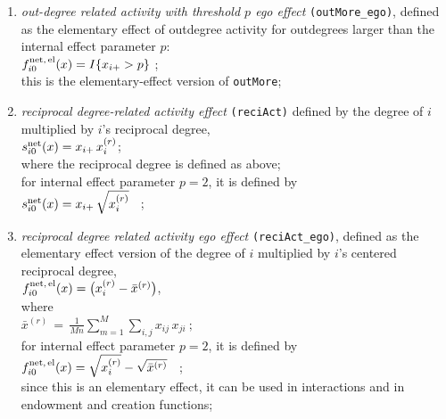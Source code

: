 \documentclass[a4paper,fleqn,11pt]{article}
\newcommand{\+}{\, + \,}
\newcommand{\vit}{\theenumi}
\begin{document}
\begin{enumerate}
 \item {\em out-degree related activity with threshold $p$ ego effect} \texttt{(outMore\_ego)},
 	 defined as the elementary effect of outdegree activity
 for  outdegrees larger than the internal effect parameter $p$:\\
 $ f^{\rm net,\, el}_{i\vit}(x)  =  I \{  x_{i+} > p \} $ ;\\
 this is the elementary-effect version of \texttt{outMore};

 \item {\em reciprocal degree-related activity effect} \texttt{(reciAct)}
 defined by the degree of $i$ multiplied by $i$'s reciprocal degree,\\
 $s^{\rm net}_{i\vit}(x) =   x_{i+}\, x^{(r)}_{i} $; \\
 where the reciprocal degree is defined as above;\\
 for internal effect parameter $p=2$, it is defined by\\
 $s^{\rm net}_{i\vit}(x) =   x_{i+}\, \sqrt{x^{(r)}_{i}} $ \ ; \\

 \item {\em reciprocal degree related activity ego effect} \texttt{(reciAct\_ego)},
 	 defined as the elementary effect version of the
 degree of $i$ multiplied by $i$'s centered reciprocal degree,\\
 $ f^{\rm net,\, el}_{i\vit}(x)  =  \big( x^{(r)}_{i} - \bar x^{(r)} \big) $, \\
 where \\
 $ \bar x^{(r)}  \,=\, \frac{1}{Mn} \sum_{m=1}^M \sum_{i,j} x_{ij}\,x_{ji} \ ;  $ \\
 for internal effect parameter $p=2$, it is defined by\\
 $f^{\rm net,\, el}_{i\vit}(x)  =   \sqrt{ x^{(r)}_{i}} - \sqrt{\bar x^{(r)}} $ \ ; \\
 since this is an elementary effect, it can be used in interactions
 and in endowment and creation functions;


\end{enumerate}
\end{document}
